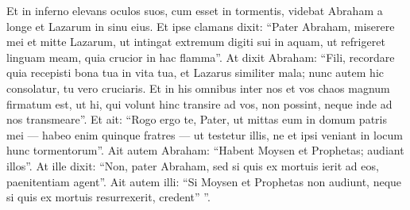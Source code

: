 \begin{biblechapter}
\begin{biblechapter}
\begin{biblechapter}
\begin{biblechapter}
\begin{biblechapter}
\begin{biblechapter}
\begin{biblechapter}
\begin{biblechapter}
\begin{biblechapter}
\begin{biblechapter}
\begin{biblechapter}
\begin{biblechapter}
\begin{biblechapter}
\begin{biblechapter}
\begin{biblechapter}
\begin{biblechapter}
\verse Et in inferno elevans oculos suos, cum esset in tormentis, videbat Abraham a longe et Lazarum in sinu eius. 
\verse Et ipse clamans dixit: “Pater Abraham, miserere mei et mitte Lazarum, ut intingat extremum digiti sui in aquam, ut refrigeret linguam meam, quia crucior in hac flamma”. 
\verse At dixit Abraham: “Fili, recordare quia recepisti bona tua in vita tua, et Lazarus similiter mala; nunc autem hic consolatur, tu vero cruciaris. 
\verse Et in his omnibus inter nos et vos chaos magnum firmatum est, ut hi, qui volunt hinc transire ad vos, non possint, neque inde ad nos transmeare”. 
\verse Et ait: “Rogo ergo te, Pater, ut mittas eum in domum patris mei 
\verse — habeo enim quinque fratres — ut testetur illis, ne et ipsi veniant in locum hunc tormentorum”. 
\verse Ait autem Abraham: “Habent Moysen et Prophetas; audiant illos”. 
\verse At ille dixit: “Non, pater Abraham, sed si quis ex mortuis ierit ad eos, paenitentiam agent”. 
\verse Ait autem illi: “Si Moysen et Prophetas non audiunt, neque si quis ex mortuis resurrexerit, credent” ”.
 

\end{biblechapter}
\end{biblechapter}
\end{biblechapter}
\end{biblechapter}
\end{biblechapter}
\end{biblechapter}
\end{biblechapter}
\end{biblechapter}
\end{biblechapter}
\end{biblechapter}
\end{biblechapter}
\end{biblechapter}
\end{biblechapter}
\end{biblechapter}
\end{biblechapter}
\end{biblechapter}

